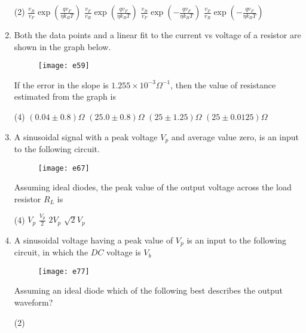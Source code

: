 \begin{enumerate}
	{}
	\begin{tasks}(2)
		\task[\textbf{A.}] $\frac{v_{R}}{v_{F}} \exp \left(\frac{q v_{F}}{\eta k_{B} T}\right)$
		\task[\textbf{B.}] $\frac{v_{F}}{v_{R}} \exp \left(\frac{q v_{F}}{\eta k_{B} T}\right)$
		\task[\textbf{C.}]  $\frac{v_{R}}{v_{F}} \exp \left(-\frac{q v_{F}}{\eta k_{B} T}\right)$
		\task[\textbf{D.}]  $\frac{v_{F}}{v_{R}} \exp \left(-\frac{q v_{F}}{\eta k_{B} T}\right)$
	\end{tasks}
	\item Both the data points and a linear fit to the current vs voltage of a resistor are shown in the graph below.\\
	\begin{figure}[H]
		\centering
		\texttt{[image: e59]}
	\end{figure}
	If the error in the slope is $1.255 \times 10^{-3} \Omega^{-1}$, then the value of resistance estimated from the graph is
	{}
	\begin{tasks}(4)
		\task[\textbf{A.}] $(0.04 \pm 0.8) \Omega$
		\task[\textbf{B.}] $(25.0 \pm 0.8) \Omega$
		\task[\textbf{C.}] $(25 \pm 1.25) \Omega$
		\task[\textbf{D.}] $(25 \pm 0.0125) \Omega$
	\end{tasks}
	\item A sinusoidal signal with a peak voltage $V_{p}$ and average value zero, is an input to the following circuit.\\
	\begin{figure}[H]
		\centering
		\texttt{[image: e67]}
	\end{figure}
	Assuming ideal diodes, the peak value of the output voltage across the load resistor $R_{L}$ is
	{}
	\begin{tasks}(4)
		\task[\textbf{A.}] $V_{p}$
		\task[\textbf{B.}] $\frac{V_{p}}{2}$
		\task[\textbf{C.}]  $2 V_{p}$
		\task[\textbf{D.}]  $\sqrt{2} V_{p}$
	\end{tasks}
	\item A sinusoidal voltage having a peak value of $V_ p$ is an input to the following circuit, in which the $DC$ voltage is $V_b$ \\
	\begin{figure}[H]
		\centering
		\texttt{[image: e77]}
	\end{figure}
	Assuming an ideal diode which of the following best describes the output waveform?
	{}
	\begin{tasks}(2)

\end{tasks}
\end{enumerate}
